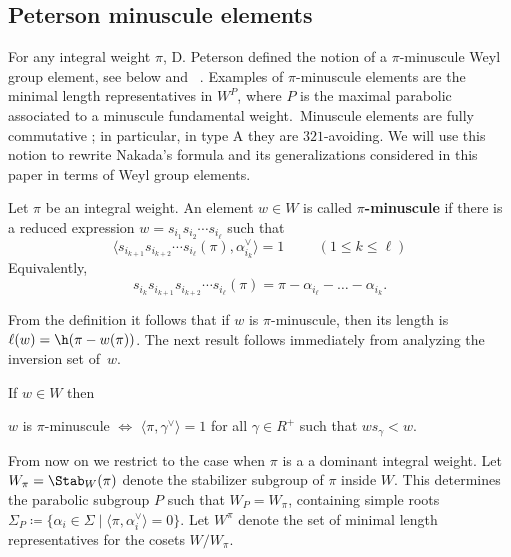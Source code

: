 \subsection{Peterson minuscule elements}\label{sec:minuscule} 
For any integral weight $\pi$, D. Peterson defined the notion of a $\pi$-minuscule 
Weyl group element, see below and ~\cite{proctor:bruhat,carrell:vector,proctor:minuscule,stembridge:fullycomm,stembridge2001minuscule,graham.kreiman:cominuscule_pt}.
Examples of $\pi$-minuscule elements are the minimal length representatives in $W^P$, where
$P$ is the maximal parabolic associated to a minuscule fundamental weight.~{Minuscule elements are fully commutative
	\cite{stembridge:fullycomm}; in particular, in type A they are $321$-avoiding.}
We will use this notion to rewrite Nakada's formula and its generalizations considered in this paper in terms of Weyl group elements. 
\begin{defin}\label{def:minuscule}
	Let $\pi$ be an integral weight.
	An element \mbox{$w\in W$} is called {\bf $\pi$-minuscule} if
	there is a reduced expression $w=s_{i_1} s_{i_2}\cdots s_{i_\ell}$ such that
	\begin{equation}\label{minuscule:1}
		\langle s_{i_{k+1}} s_{i_{k+2}}\cdots s_{i_\ell}(\pi), \alpha_{i_k}^\vee \rangle=1\hspace{1cm} (1\leq k\leq \ell)
	\end{equation}
	Equivalently, 
	\begin{equation}\label{equ:actiononmin}
		s_{i_k} s_{i_{k+1}} s_{i_{k+2}}\cdots s_{i_\ell}(\pi) = \pi - \alpha_{i_\ell} - \ldots - \alpha_{i_k}.
	\end{equation}
\end{defin}
From the definition it follows that if $w$ is $\pi$-minuscule, then its length is $\ell(w) = \h(\pi- w(\pi))$.  
The next result follows immediately from analyzing the inversion set of~$w$. 
\begin{lemma}\label{lem:gamma}
	If $w\in W$ then
	\begin{center}
		$w$ is $\pi$-minuscule $\iff$ $\langle\pi, \gamma^\vee\rangle=1$ for all $\gamma\in R^{+}$
		such that $w s_\gamma <w$.
	\end{center}
\end{lemma}
From now on we restrict to the case when $\pi$ is a a dominant integral weight. Let~$W_\pi=\Stab_W(\pi)$ denote the stabilizer subgroup of $\pi$ inside $W$. This determines the parabolic subgroup $P$ such that $W_P=W_\pi$, containing simple roots \mbox{$\Sigma_P\coloneqq \{\alpha_i\in \Sigma\mid \langle \pi,\alpha_i^\vee\rangle=0\}$}. Let $W^\pi$ denote the set of minimal length representatives for the cosets $W/W_\pi$.
